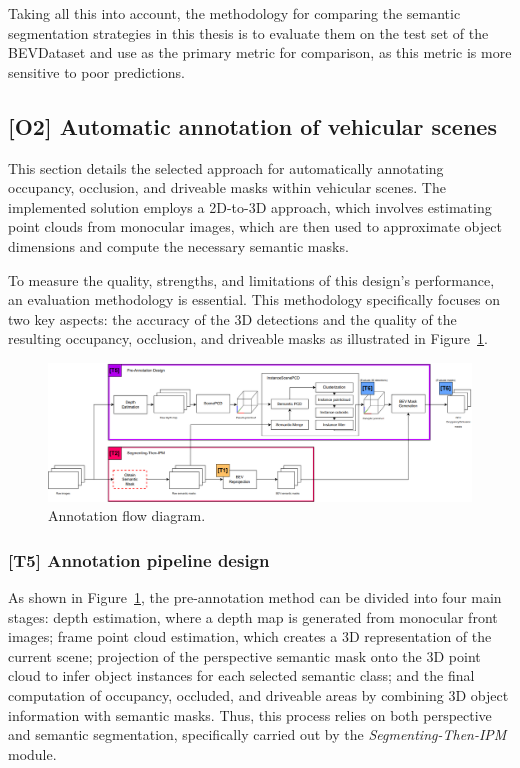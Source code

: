 Taking all this into account, the methodology for comparing the  semantic segmentation strategies in this thesis is to evaluate them on the test set of the BEVDataset and use  as the primary metric for comparison, as this metric is more sensitive to poor predictions.


\subsection{[O2] Automatic annotation of vehicular scenes} \label{sec:aplication}
This section details the selected approach for automatically annotating occupancy, occlusion, and driveable masks within vehicular scenes. The implemented solution employs a 2D-to-3D approach, which involves estimating point clouds from monocular images, which are then used to approximate object dimensions and compute the necessary semantic masks.

To measure the quality, strengths, and limitations of this design's performance, an evaluation methodology is essential. This methodology specifically focuses on two key aspects: the accuracy of the 3D detections and the quality of the resulting occupancy, occlusion, and driveable masks as illustrated in Figure~\ref{fig:application_flow_diagram}.

\begin{figure}[!ht]
    \centering
    \includegraphics[width=\linewidth]{images/methodology/Application_flow_diagram.png}
    \caption{Annotation flow diagram.}
    \label{fig:application_flow_diagram}
\end{figure}

\subsubsection{[T5] Annotation pipeline design}
As shown in Figure~\ref{fig:application_flow_diagram}, the pre-annotation method can be divided into four main stages: depth estimation, where a depth map is generated from monocular front images; frame point cloud estimation, which creates a 3D representation of the current scene; projection of the perspective semantic mask onto the 3D point cloud to infer object instances for each selected semantic class; and the final computation of occupancy, occluded, and driveable areas by combining 3D object information with  semantic masks.  Thus, this process relies on both perspective and  semantic segmentation, specifically carried out by the \textit{Segmenting-Then-IPM} module.


